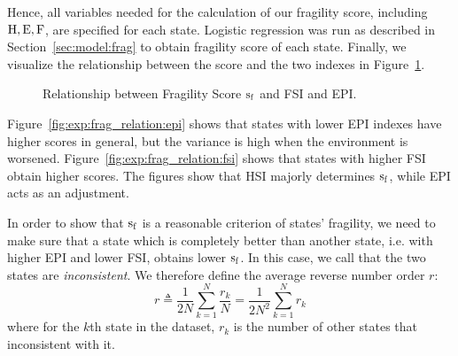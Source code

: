 Hence, all variables needed for the calculation of our fragility score, including $\operatorname*{{H}}, \operatorname*{E}, \operatorname*{F}$, are specified for each state. Logistic regression was run as described in Section~\ref{sec:model:frag} to obtain fragility score of each state. Finally, we visualize the relationship between the score and the two indexes in Figure~\ref{fig:exp:frag_relation}.
\begin{figure}[htbp]
    \centering
   \caption{Relationship between Fragility Score $\operatorname*{s_f}$ and FSI and EPI.} 
   \label{fig:exp:frag_relation}
\end{figure}
Figure~\ref{fig:exp:frag_relation:epi} shows that states with lower EPI indexes have higher scores in general, but the variance is high when the environment is worsened. Figure~\ref{fig:exp:frag_relation:fsi} shows that states with higher FSI obtain higher scores. 
The figures show that HSI majorly determines $\operatorname*{s_f}$, while EPI acts as an adjustment.

In order to show that $\operatorname*{s_f}$ is a reasonable criterion of states' fragility, we need to make sure that a state which is completely better than another state, i.e. with higher EPI and lower FSI, obtains lower $\operatorname*{s_f}$. In this case, we call that the two states are \emph{inconsistent}.
We therefore define the average reverse number order $r$: 
\begin{equation}
   r\triangleq \frac{1}{2N}\sum_{k=1}^N \frac{r_k}{N}  = \frac{1}{2N^2}\sum_{k=1}^N r_k
   \label{eqn:exp:reverse_order}
\end{equation}
where for the $k$th state in the dataset, $r_k$ is the number of other states that inconsistent with it.

